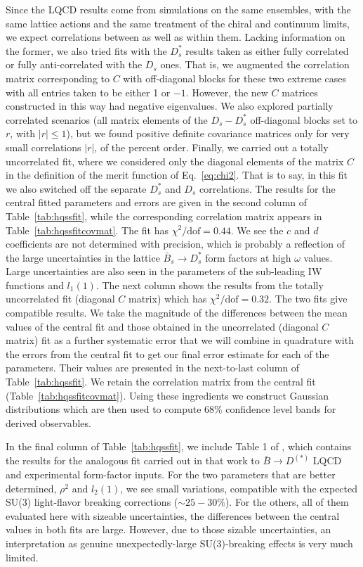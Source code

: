 \documentclass[aps,superscriptaddress,showpacs,nofootinbib,11pt]{revtex4-1}
\begin{document}
Since the LQCD results come from simulations on the same ensembles, with the same lattice actions and the same treatment of the chiral and continuum limits, we expect correlations between as well as within them. Lacking information on the former, we also tried fits with the $D^*_s$ results taken as either fully  correlated or fully anti-correlated with the $D_s$ ones. That is, we augmented the correlation matrix corresponding to $C$ with off-diagonal blocks for these two extreme cases with all entries taken to be either 1 or $-1$. However, the new $C$ matrices constructed in this way had negative eigenvalues. We also explored partially correlated scenarios (all matrix elements of the $D_s-D^*_s$ off-diagonal blocks set to $r$, with $|r|\le 1$),  but we found positive definite covariance matrices only for very small correlations $|r|$, of the  percent order. Finally, we carried out a totally uncorrelated fit, where we considered only the diagonal elements of the matrix $C$ in the definition of the merit function of Eq.~\eqref{eq:chi2}. That is to say, in this fit we also switched off  the separate $D^*_s$ and $D_s$ correlations.
The results for the central fitted parameters and errors are given in the second column of Table~\ref{tab:hqssfit}, while the corresponding correlation matrix appears in Table~\ref{tab:hqssfitcovmat}. The fit has $\chi^2/\text{dof}=0.44$. 
We see the $c$ and $d$ coefficients are not determined with precision, which is probably a reflection of the large uncertainties in the lattice $\bar B_s\to D_s^*$ form factors  at high $\omega$ values. Large uncertainties are also seen in the parameters of the sub-leading IW functions  and  $l_1(1)$.
The next  column shows the results from the totally uncorrelated fit (diagonal $C$ matrix) which has $\chi^2/\text{dof}=0.32$. The two fits give compatible results. We take the magnitude of the differences between the mean values of the central fit and those obtained in the uncorrelated (diagonal $C$ matrix) fit as a further systematic error that we will combine in quadrature with the errors from the central fit to get our final error estimate for each of the parameters. Their values are presented in the next-to-last column of Table~\ref{tab:hqssfit}. We retain the correlation matrix from the central fit (Table~\ref{tab:hqssfitcovmat}). Using these ingredients we construct Gaussian distributions which are then used to compute 68\% confidence level bands for derived observables.

In the final column of Table~\ref{tab:hqssfit}, we include  Table 1 of \cite{Murgui:2019czp}, which contains the results for the analogous fit carried out in that work to $\bar B \to D^{(*)}$ LQCD and experimental form-factor inputs. For the two parameters that are better determined, $\rho^2$ and $l_2(1)$, we see  small variations, compatible with the expected SU(3) light-flavor breaking corrections ($\sim 25-30\% $). For the others, all of them evaluated here  with sizeable uncertainties, the differences between the central values in both fits are large. However, due to those sizable uncertainties,  an interpretation as  genuine unexpectedly-large SU(3)-breaking effects is very much limited. 
\end{document}
